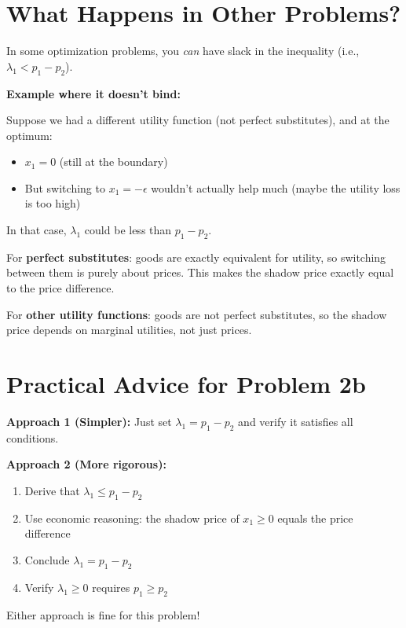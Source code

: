 \documentclass[11pt]{article}
\begin{document}
\section{What Happens in Other Problems?}

In some optimization problems, you \textit{can} have slack in the inequality (i.e., $\lambda_1 < p_1 - p_2$).

\textbf{Example where it doesn't bind:}

Suppose we had a different utility function (not perfect substitutes), and at the optimum:
\begin{itemize}
\item $x_1 = 0$ (still at the boundary)
\item But switching to $x_1 = -\epsilon$ wouldn't actually help much (maybe the utility loss is too high)
\end{itemize}

In that case, $\lambda_1$ could be less than $p_1 - p_2$.

\begin{tcolorbox}[colback=green!5!white,colframe=green!75!black,title=The Key Difference]
For \textbf{perfect substitutes}: goods are exactly equivalent for utility, so switching between them is purely about prices. This makes the shadow price exactly equal to the price difference.

For \textbf{other utility functions}: goods are not perfect substitutes, so the shadow price depends on marginal utilities, not just prices.
\end{tcolorbox}

\section{Practical Advice for Problem 2b}

\begin{tcolorbox}[colback=yellow!10!white,colframe=orange!75!black,title=What to Write on Your Homework]

\textbf{Approach 1 (Simpler):} Just set $\lambda_1 = p_1 - p_2$ and verify it satisfies all conditions.

\textbf{Approach 2 (More rigorous):}
\begin{enumerate}
\item Derive that $\lambda_1 \leq p_1 - p_2$
\item Use economic reasoning: the shadow price of $x_1 \geq 0$ equals the price difference
\item Conclude $\lambda_1 = p_1 - p_2$
\item Verify $\lambda_1 \geq 0$ requires $p_1 \geq p_2$
\end{enumerate}

Either approach is fine for this problem!
\end{tcolorbox}
\end{document}
